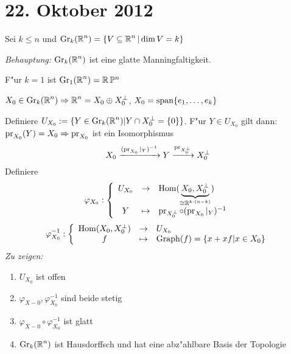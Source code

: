 \section{22. Oktober 2012}
\setcounter{Aufg}{0} %
\setcounter{Loes}{0}

\begin{dfn}
Sei $k \le n$ und $\operatorname{Gr}_k(\operatorname{\mathbb{R}}^n) = \{ V \subseteq \operatorname{\mathbb{R}}^n | \operatorname{dim} V = k\}$
\end{dfn}

\emph{Behauptung:} $\operatorname{Gr}_k(\operatorname{\mathbb{R}}^n)$ ist eine glatte Manningfaltigkeit.

\begin{bem}
F"ur $k = 1$ ist $\operatorname{Gr}_1(\operatorname{\mathbb{R}}^n) = \operatorname{\mathbb{R}} \mathbb{P}^n$
\end{bem}

$X_0 \in \operatorname{Gr}_k(\operatorname{\mathbb{R}}^n) \Rightarrow \operatorname{\mathbb{R}}^n = X_0 \oplus X_0^\perp$, $X_0 = \operatorname{span}\{e_1,\ldots ,e_k\}$ 

Definiere $U_{X_0} := \{Y \in \operatorname{Gr}_k(\operatorname{\mathbb{R}}^n) | Y \cap X_0^\perp = \{0\}\}$. F"ur $Y \in U_{X_0}$ gilt dann: $\operatorname{pr}_{X_0}(Y) = X_0 \Rightarrow \operatorname{pr}_{X_0}$ ist ein Isomorphismus
	\[X_0 \xrightarrow{(\operatorname{pr}_{X_0}|_Y)^{-1}} Y \xrightarrow{\operatorname{pr}_{X_0^\perp}} X_0^\perp \]
Definiere
	\[ \varphi_{X_0}: \left\{\begin{array}{ccl} U_{X_0} &\to& \operatorname{Hom}(\underbrace{X_0, X_0^\perp}_{\cong \operatorname{\mathbb{R}}^{k \cdot (n-k)}}) \\
		Y &\mapsto& \operatorname{pr}_{X_0^\perp} \circ (\operatorname{pr}_{X_0}|_Y)^{-1} \end{array}\right.\]
	\[ \varphi_{X_0}^{-1}: \left\{\begin{array}{ccl} \operatorname{Hom}(X_0, X_0^\perp) &\to& U_{X_0} \\
		f &\mapsto& \operatorname{Graph}(f) = \{x + xf | x \in X_0\} \end{array}\right.\]
\emph{Zu zeigen:}\begin{enumerate}
\item
	$U_{X_0}$ ist offen
\item
	$\varphi_{X-0}, \varphi_{X_0}^{-1}$ sind beide stetig
\item
	$\varphi_{X-0} \circ \varphi_{X_0}^{-1}$ ist glatt
\item
	$\operatorname{Gr}_k(\operatorname{\mathbb{R}}^n)$ ist Hausdorffsch und hat eine abz"ahlbare Basis der Topologie
\end{enumerate}

